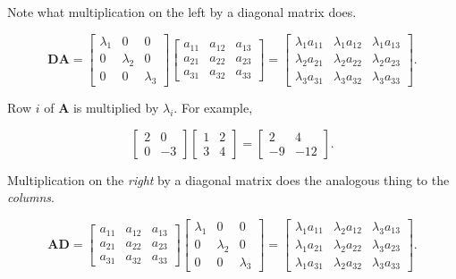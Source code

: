 \documentclass[
]{book}
\theoremstyle{definition}
\theoremstyle{definition}
\theoremstyle{definition}
\theoremstyle{definition}
\theoremstyle{remark}
\begin{document}
Note what multiplication on the left by a diagonal matrix does.

\[\mathbf{D}\mathbf{A}=\begin{bmatrix}\lambda_1 & 0 & 0\\0 & \lambda_2 & 0\\0 & 0 & \lambda_3\end{bmatrix}\begin{bmatrix}a_{11} & a_{12} & a_{13}\\a_{21} & a_{22} & a_{23}\\a_{31} & a_{32} & a_{33}\end{bmatrix}= \begin{bmatrix}\lambda_1a_{11}& \lambda_1a_{12} & \lambda_1a_{13}\\\lambda_2a_{21} & \lambda_2a_{22}& \lambda_2a_{23}\\\lambda_3a_{31} & \lambda_3a_{32} & \lambda_3a_{33}\end{bmatrix}.\]

Row \(i\) of \(\mathbf{A}\) is multiplied by \(\lambda_i\). For example,

\[\begin{bmatrix}2 & 0\\0 & -3\end{bmatrix}\begin{bmatrix}1 & 2\\3 & 4\end{bmatrix}=\begin{bmatrix}2 & 4\\-9&-12\end{bmatrix}.\]

Multiplication on the \emph{right} by a diagonal matrix does the analogous thing to the \emph{columns}.

\[\mathbf{A}\mathbf{D}=\begin{bmatrix}a_{11} & a_{12} & a_{13}\\a_{21} & a_{22} & a_{23}\\a_{31} & a_{32} & a_{33}\end{bmatrix}\begin{bmatrix}\lambda_1 & 0 & 0\\0 & \lambda_2 & 0\\0 & 0 & \lambda_3\end{bmatrix}=\begin{bmatrix}\lambda_1a_{11} & \lambda_2a_{12} & \lambda_3a_{13}\\\lambda_1a_{21} & \lambda_2a_{22} & \lambda_3 a_{23}\\ \lambda_1a_{31} & \lambda_2 a_{32} & \lambda_3 a_{33}\end{bmatrix}.\]
\end{document}
